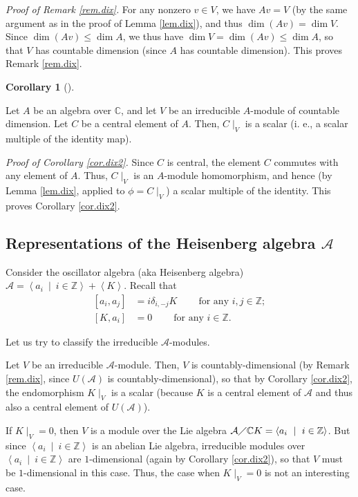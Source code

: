 \documentclass
[numbers=enddot,12pt,final,onecolumn,german,notitlepage]{scrartcl}%
\theoremstyle{definition}
\newtheorem{coro}[theo]{Corollary}
\newenvironment{corollary}[1][]
{\begin{coro}[#1]\begin{leftbar}}
{\end{leftbar}\end{coro}}
\begin{document}
\textit{Proof of Remark \ref{rem.dix}.} For any nonzero $v\in V$, we have
$Av=V$ (by the same argument as in the proof of Lemma \ref{lem.dix}), and thus
$\dim\left(  Av\right)  =\dim V$. Since $\dim\left(  Av\right)  \leq\dim A$,
we thus have $\dim V=\dim\left(  Av\right)  \leq\dim A$, so that $V$ has
countable dimension (since $A$ has countable dimension). This proves Remark
\ref{rem.dix}.

\begin{corollary}
\label{cor.dix2}Let $A$ be an algebra over $\mathbb{C}$, and let $V$ be an
irreducible $A$-module of countable dimension. Let $C$ be a central element of
$A$. Then, $C\mid_{V}$ is a scalar (i. e., a scalar multiple of the identity map).
\end{corollary}

\textit{Proof of Corollary \ref{cor.dix2}.} Since $C$ is central, the element
$C$ commutes with any element of $A$. Thus, $C\mid_{V}$ is an $A$-module
homomorphism, and hence (by Lemma \ref{lem.dix}, applied to $\phi=C\mid_{V}$)
a scalar multiple of the identity. This proves Corollary \ref{cor.dix2}.

\subsection{Representations of the Heisenberg algebra $\mathcal{A}$}

Consider the oscillator algebra (aka Heisenberg algebra) $\mathcal{A}%
=\left\langle a_{i}\ \mid\ i\in\mathbb{Z}\right\rangle +\left\langle
K\right\rangle $. Recall that%
\begin{align*}
\left[  a_{i},a_{j}\right]   &  =i\delta_{i,-j}K\ \ \ \ \ \ \ \ \ \ \text{for
any }i,j\in\mathbb{Z};\\
\left[  K,a_{i}\right]   &  =0\ \ \ \ \ \ \ \ \ \ \text{for any }%
i\in\mathbb{Z}.
\end{align*}


Let us try to classify the irreducible $\mathcal{A}$-modules.

Let $V$ be an irreducible $\mathcal{A}$-module. Then, $V$ is
countably-dimensional (by Remark \ref{rem.dix}, since $U\left(  \mathcal{A}%
\right)  $ is countably-dimensional), so that by Corollary \ref{cor.dix2}, the
endomorphism $K\mid_{V}$ is a scalar (because $K$ is a central element of
$\mathcal{A}$ and thus also a central element of $U\left(  \mathcal{A}\right)
$).

If $K\mid_{V}=0$, then $V$ is a module over the Lie algebra $\mathcal{A}%
\diagup\mathbb{C}K=\left\langle a_{i}\ \mid\ i\in\mathbb{Z}\right\rangle $.
But since $\left\langle a_{i}\ \mid\ i\in\mathbb{Z}\right\rangle $ is an
abelian Lie algebra, irreducible modules over $\left\langle a_{i}\ \mid
\ i\in\mathbb{Z}\right\rangle $ are $1$-dimensional (again by Corollary
\ref{cor.dix2}), so that $V$ must be $1$-dimensional in this case. Thus, the
case when $K\mid_{V}=0$ is not an interesting case.
\end{document}
